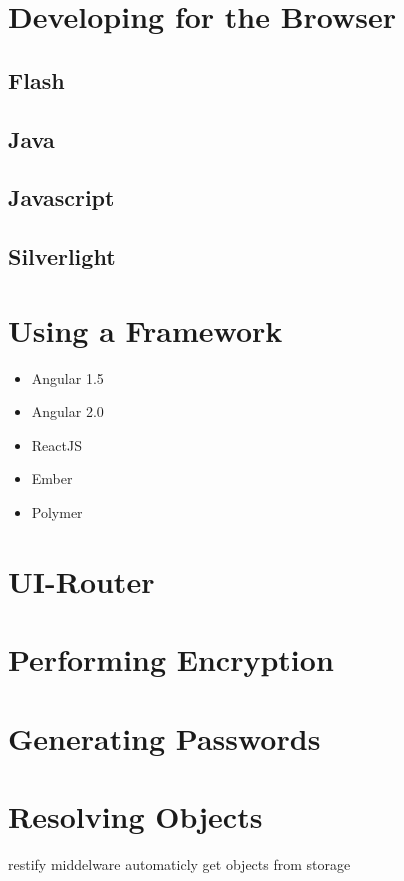 	\section{Developing for the Browser}
		\subsection{Flash}
		\subsection{Java}
		\subsection{Javascript}
		\subsection{Silverlight}


	\section{Using a Framework}
		\begin{itemize}
			\item Angular 1.5
			\item Angular 2.0
			\item ReactJS
			\item Ember
			\item Polymer
		\end{itemize}


	\section{UI-Router}
		\label{sec:impl:ui-router}

	\section{Performing Encryption}

	\section{Generating Passwords}


	
	\section{Resolving Objects}
		restify middelware automaticly get objects from storage
